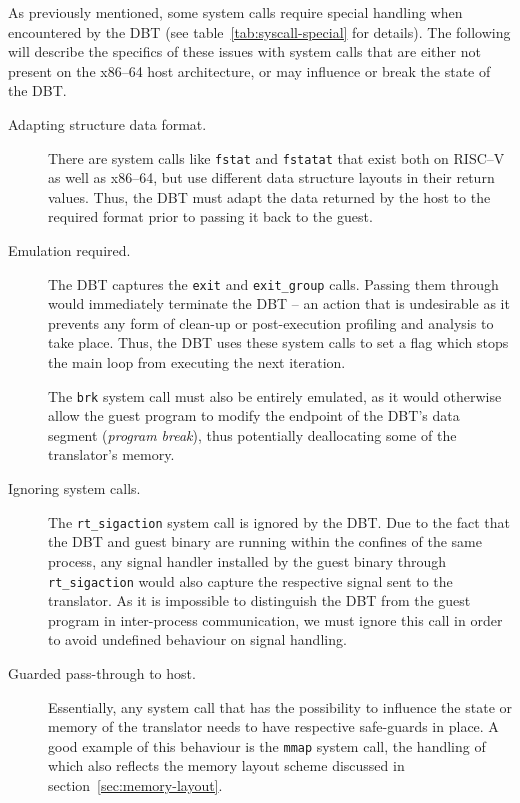 As previously mentioned, some system calls require special handling when encountered by the DBT (see table~\vref{tab:syscall-special} for details).
The following will describe the specifics of these issues with system calls that are either not present on the x86--64 host architecture, or may influence or break the state of the DBT\@.
\begin{description}
	\item[Adapting structure data format.]
	There are system calls like \texttt{fstat} and \texttt{fstatat} that exist both on RISC--V as well as x86--64, but use different data structure layouts in their return values.
	Thus, the DBT must adapt the data returned by the host to the required format prior to passing it back to the guest.
	
	
	\item[Emulation required.]
	The DBT captures the \texttt{exit} and \texttt{exit\_group} calls.
	Passing them through would immediately terminate the DBT -- an action that is undesirable as it prevents any form of clean-up or post-execution profiling and analysis to take place.
	Thus, the DBT uses these system calls to set a flag which stops the main loop from executing the next iteration.
	
	The \texttt{brk} system call must also be entirely emulated, as it would otherwise allow the guest program to modify the endpoint of the DBT's data segment (\textit{program break}), thus potentially deallocating some of the translator's memory. %
	
	
	\item[Ignoring system calls.]
	The \texttt{rt\_sigaction} system call is ignored by the DBT\@.
	Due to the fact that the DBT and guest binary are running within the confines of the same process, any signal handler installed by the guest binary through \texttt{rt\_sigaction} would also capture the respective signal sent to the translator.
	As it is impossible to distinguish the DBT from the guest program in inter-process communication, we must ignore this call in order to avoid undefined behaviour on signal handling.
	
	
	\item[Guarded pass-through to host.]
	Essentially, any system call that has the possibility to influence the state or memory of the translator needs to have respective safe-guards in place.
	A good example of this behaviour is the \texttt{mmap} system call, the handling of which also reflects the memory layout scheme discussed in section~\vref{sec:memory-layout}.
	

\end{description}
